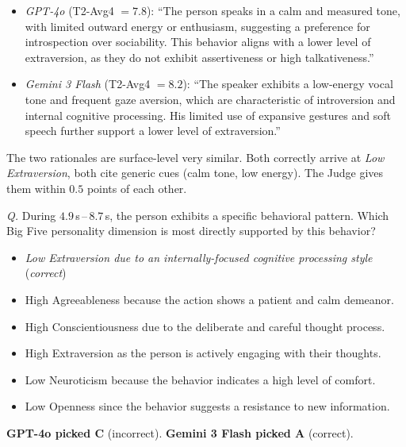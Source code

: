 \documentclass{llmxive}
\begin{document}
\begin{examplebox}[title={Task 2: open-ended reasoning (both models predict Low Extraversion)}]
\begin{itemize}[leftmargin=1.4em, itemsep=2pt, topsep=2pt]
\item \emph{GPT-4o} (T2-Avg4 $=\!7.8$): ``The person speaks in a calm and measured tone, with limited outward energy or enthusiasm, suggesting a preference for introspection over sociability. This behavior aligns with a lower level of extraversion, as they do not exhibit assertiveness or high talkativeness.''
\item \emph{Gemini 3 Flash} (T2-Avg4 $=\!8.2$): ``The speaker exhibits a low-energy vocal tone and frequent gaze aversion, which are characteristic of introversion and internal cognitive processing. His limited use of expansive gestures and soft speech further support a lower level of extraversion.''
\end{itemize}
The two rationales are surface-level very similar. Both correctly arrive at \emph{Low Extraversion}, both cite generic cues (calm tone, low energy). The Judge gives them within $0.5$ points of each other.
\end{examplebox}

\begin{examplebox}[title={Task 3: structured cue-grounding probe (same trait, divergent outcome)}]
\emph{Q.} During $4.9$\,s\,--\,$8.7$\,s, the person exhibits a specific behavioral pattern. Which Big Five personality dimension is most directly supported by this behavior?
\begin{itemize}[leftmargin=1.4em, itemsep=0pt, topsep=1pt, parsep=0pt]
\item[A.] \emph{Low Extraversion due to an internally-focused cognitive processing style} \hfill (\emph{correct})
\item[B.] High Agreeableness because the action shows a patient and calm demeanor.
\item[C.] High Conscientiousness due to the deliberate and careful thought process.
\item[D.] High Extraversion as the person is actively engaging with their thoughts.
\item[E.] Low Neuroticism because the behavior indicates a high level of comfort.
\item[F.] Low Openness since the behavior suggests a resistance to new information.
\end{itemize}
\textbf{GPT-4o picked C} (incorrect). \quad \textbf{Gemini 3 Flash picked A} (correct).
\end{examplebox}
\end{document}

